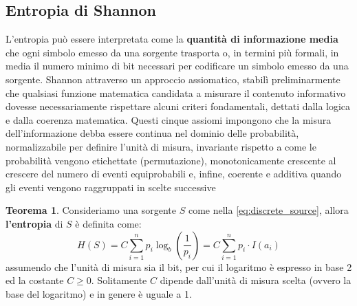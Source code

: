 \documentclass{article}
\theoremstyle{definition}
\newtheorem{theorem}{Teorema}[section] %
\numberwithin{equation}{section}
\begin{document}
\subsection{Entropia di Shannon}
L'entropia può essere interpretata come la \textbf{quantità di informazione media} che ogni simbolo emesso da una sorgente trasporta o, in termini più formali, in media il numero minimo di bit necessari per codificare un simbolo emesso da una sorgente. Shannon attraverso un approccio assiomatico, stabilì preliminarmente che qualsiasi funzione matematica candidata a misurare il contenuto informativo dovesse necessariamente rispettare alcuni criteri fondamentali, dettati dalla logica e dalla coerenza matematica. Questi cinque assiomi impongono che la misura dell'informazione debba essere continua nel dominio delle probabilità, normalizzabile per definire l'unità di misura, invariante rispetto a come le probabilità vengono etichettate (permutazione), monotonicamente crescente al crescere del numero di eventi equiprobabili e, infine, coerente e additiva quando gli eventi vengono raggruppati in scelte successive
\begin{theorem}
    Consideriamo una sorgente $S$ come nella \eqref{eq:discrete_source}, allora \textbf{l'entropia} di $S$ è definita come:
    \begin{equation}\label{eq:shannon_entropy}
        H(S)=C\sum_{i=1}^np_i\log_b\left(\frac{1}{p_i}\right)=C\sum_{i=1}^np_i\cdot I(a_i)
    \end{equation}
    assumendo che l'unità di misura sia il bit, per cui il logaritmo è espresso in base 2 ed la costante $C\geq0$. Solitamente $C$ dipende dall'unità di misura scelta (ovvero la base del logaritmo) e in genere è uguale a 1.
\end{theorem}
\end{document}
